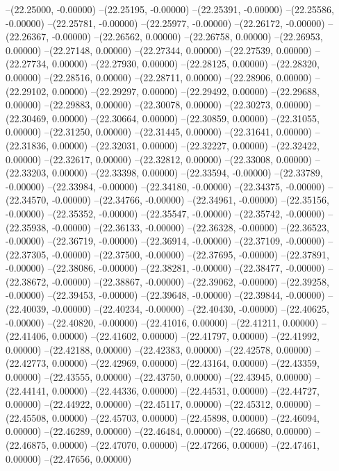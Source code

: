 --(22.25000, -0.00000)
--(22.25195, -0.00000)
--(22.25391, -0.00000)
--(22.25586, -0.00000)
--(22.25781, -0.00000)
--(22.25977, -0.00000)
--(22.26172, -0.00000)
--(22.26367, -0.00000)
--(22.26562, 0.00000)
--(22.26758, 0.00000)
--(22.26953, 0.00000)
--(22.27148, 0.00000)
--(22.27344, 0.00000)
--(22.27539, 0.00000)
--(22.27734, 0.00000)
--(22.27930, 0.00000)
--(22.28125, 0.00000)
--(22.28320, 0.00000)
--(22.28516, 0.00000)
--(22.28711, 0.00000)
--(22.28906, 0.00000)
--(22.29102, 0.00000)
--(22.29297, 0.00000)
--(22.29492, 0.00000)
--(22.29688, 0.00000)
--(22.29883, 0.00000)
--(22.30078, 0.00000)
--(22.30273, 0.00000)
--(22.30469, 0.00000)
--(22.30664, 0.00000)
--(22.30859, 0.00000)
--(22.31055, 0.00000)
--(22.31250, 0.00000)
--(22.31445, 0.00000)
--(22.31641, 0.00000)
--(22.31836, 0.00000)
--(22.32031, 0.00000)
--(22.32227, 0.00000)
--(22.32422, 0.00000)
--(22.32617, 0.00000)
--(22.32812, 0.00000)
--(22.33008, 0.00000)
--(22.33203, 0.00000)
--(22.33398, 0.00000)
--(22.33594, -0.00000)
--(22.33789, -0.00000)
--(22.33984, -0.00000)
--(22.34180, -0.00000)
--(22.34375, -0.00000)
--(22.34570, -0.00000)
--(22.34766, -0.00000)
--(22.34961, -0.00000)
--(22.35156, -0.00000)
--(22.35352, -0.00000)
--(22.35547, -0.00000)
--(22.35742, -0.00000)
--(22.35938, -0.00000)
--(22.36133, -0.00000)
--(22.36328, -0.00000)
--(22.36523, -0.00000)
--(22.36719, -0.00000)
--(22.36914, -0.00000)
--(22.37109, -0.00000)
--(22.37305, -0.00000)
--(22.37500, -0.00000)
--(22.37695, -0.00000)
--(22.37891, -0.00000)
--(22.38086, -0.00000)
--(22.38281, -0.00000)
--(22.38477, -0.00000)
--(22.38672, -0.00000)
--(22.38867, -0.00000)
--(22.39062, -0.00000)
--(22.39258, -0.00000)
--(22.39453, -0.00000)
--(22.39648, -0.00000)
--(22.39844, -0.00000)
--(22.40039, -0.00000)
--(22.40234, -0.00000)
--(22.40430, -0.00000)
--(22.40625, -0.00000)
--(22.40820, -0.00000)
--(22.41016, 0.00000)
--(22.41211, 0.00000)
--(22.41406, 0.00000)
--(22.41602, 0.00000)
--(22.41797, 0.00000)
--(22.41992, 0.00000)
--(22.42188, 0.00000)
--(22.42383, 0.00000)
--(22.42578, 0.00000)
--(22.42773, 0.00000)
--(22.42969, 0.00000)
--(22.43164, 0.00000)
--(22.43359, 0.00000)
--(22.43555, 0.00000)
--(22.43750, 0.00000)
--(22.43945, 0.00000)
--(22.44141, 0.00000)
--(22.44336, 0.00000)
--(22.44531, 0.00000)
--(22.44727, 0.00000)
--(22.44922, 0.00000)
--(22.45117, 0.00000)
--(22.45312, 0.00000)
--(22.45508, 0.00000)
--(22.45703, 0.00000)
--(22.45898, 0.00000)
--(22.46094, 0.00000)
--(22.46289, 0.00000)
--(22.46484, 0.00000)
--(22.46680, 0.00000)
--(22.46875, 0.00000)
--(22.47070, 0.00000)
--(22.47266, 0.00000)
--(22.47461, 0.00000)
--(22.47656, 0.00000)
